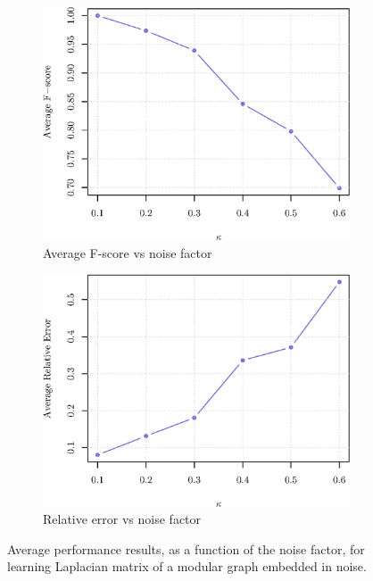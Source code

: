 \begin{figure}[!htb]
    \begin{subfigure}[b]{0.45\textwidth}
        \includegraphics[width=\textwidth]{block-diagonal/latex/figures/fscore_kappa.eps}
        \caption{Average F-score vs noise factor}
    \end{subfigure}
    \begin{subfigure}[b]{0.45\textwidth}
        \includegraphics[width=\textwidth]{block-diagonal/latex/figures/relative_error_kappa.eps}
        \caption{Relative error vs noise factor}
    \end{subfigure}
    \caption{Average performance results, as a function of the noise factor, for learning Laplacian matrix of a modular graph embedded in noise.}
    \label{fig:performance}
\end{figure}

